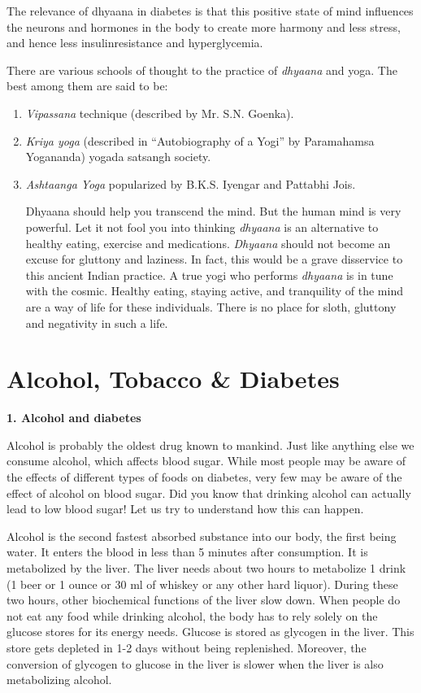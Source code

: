 The relevance of dhyaana in diabetes is that this positive state of mind influences the neurons and hormones in the body to create more harmony and less stress, and hence less insulin\break resistance and hyperglycemia.

There are various schools of thought to the practice of \textit{dhyaana} and yoga. The best among them are said to be:

\begin{enumerate}[•]
\itemsep=0pt
\item \textit{Vipassana} technique (described by Mr. S.N. Goenka).
\item \textit{Kriya yoga} (described in “Autobiography of a Yogi” by Paramahamsa Yogananda) yogada satsangh society.
\item \textit{Ashtaanga Yoga} popularized by B.K.S. Iyengar and Pattabhi Jois.

 Dhyaana should help you transcend the mind. But the human mind is very powerful. Let it not fool you into thinking \textit{dhyaana} is an alternative to healthy eating, exercise and medications. \textit{Dhyaana} should not become an excuse for gluttony and laziness. In fact, this would be a grave disservice to this ancient Indian practice. A true yogi who performs \textit{dhyaana} is in tune with the cosmic. Healthy eating, staying active, and tranquility of the mind are a way of life for these indi\-viduals. There is no place for sloth, gluttony and negativity in such a life.
\end{enumerate}


\chapter{Alcohol, Tobacco \& Diabetes}\label{chap28}

\noindent\textbf{1. Alcohol and diabetes}

Alcohol is probably the oldest drug known to mankind. Just like anything else we consume alcohol, which affects blood sugar. While most people may be aware of the effects of different types of foods on diabetes, very few may be aware of the effect of alcohol on blood sugar. Did you know that drinking alcohol can actually lead to low blood sugar! Let us try to understand how this can happen.

Alcohol is the second fastest absorbed substance into our body, the first being water. It enters the blood in less than 5 minutes after consumption. It is metabolized by the liver. The liver needs about two hours to metabolize 1 drink (1 beer or 1 ounce or 30 ml of whiskey or any other hard liquor). During these two hours, other biochemical functions of the liver slow down. When people do not eat any food while drinking alcohol, the body has to rely solely on the glucose stores for its energy needs. Glucose is stored as glycogen in the liver. This store gets depleted in 1-2 days without being replenished. Moreover, the conversion of glycogen to glucose in the liver is slower when the liver is also metabolizing alcohol.

